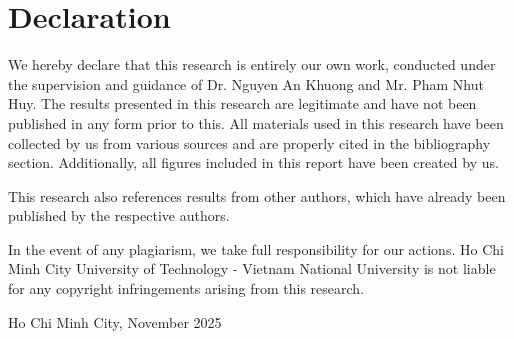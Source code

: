 \chapter*{Declaration}

We hereby declare that this research is entirely our own work, conducted under the supervision and guidance of Dr. Nguyen An Khuong and Mr. Pham Nhut Huy. The results presented in this research are legitimate and have not been published in any form prior to this. All materials used in this research have been collected by us from various sources and are properly cited in the bibliography section. Additionally, all figures included in this report have been created by us. 

This research also references results from other authors, which have already been published by the respective authors. 

In the event of any plagiarism, we take full responsibility for our actions. Ho Chi Minh City University of Technology - Vietnam National University is not liable for any copyright infringements arising from this research.

\vspace{2cm}
\begin{flushright}
Ho Chi Minh City, November 2025\\
\vspace{3mm}
\\
% 
\end{flushright}

